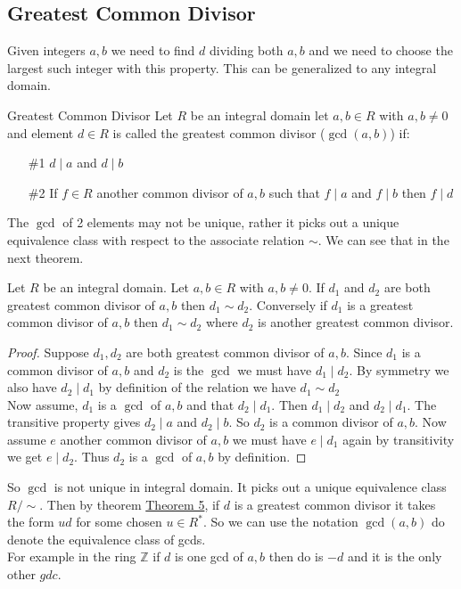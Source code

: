 \documentclass[16pt,a4paper]{article}
\theoremstyle{definition}
\begin{document}
\subsection{Greatest Common Divisor}
Given integers $a,b$ we need to find $d$ dividing both $a,b$ and we need to choose the largest such integer with this property. This can be generalized to any integral domain. 

\begin{defn}{Greatest Common Divisor}{}
Let $R$ be an integral domain let $a,b\in R$ with $a,b\neq 0$ and element $d\in R$ is called the greatest common divisor ($\gcd (a,b)$) if: 
\begin{itemize}
\item[\#1] $d\mid a$ and $d\mid b$
\item[\#2] If $f\in R$ another common divisor of $a,b$ such that $f\mid a$ and $f\mid b$ then $f\mid d$
\end{itemize}
\end{defn}
The $\gcd$ of 2 elements may not be unique, rather it picks out a unique equivalence class with respect to the associate relation $\sim$. We can see that in the next theorem. 

\begin{thm}{}{}
Let $R$ be an integral domain. Let $a,b \in R$ with $a,b\neq 0$. If $d_1$ and $d_2$ are both greatest common divisor of $a,b$ then $d_1\sim d_2$. Conversely if $d_1$ is a greatest common divisor  of $a,b$ then $d_1\sim d_2$ where $d_2$ is another greatest common divisor.  
\end{thm}
\begin{proof}
Suppose $d_1, d_2$ are both greatest common divisor of $a,b$. Since $d_1$ is a common divisor of $a,b$ and $d_2$ is the $\gcd$ we must have $d_1\mid d_2$. By symmetry we also have $d_2\mid d_1$ by definition of the relation we have $d_1\sim d_2$
\\
\newpage
Now assume, $d_1$ is a $\gcd$ of $a,b$ and that $d_2 \mid d_1$. Then $d_1\mid d_2$ and $d_2\mid d_1$. The transitive property gives $d_2\mid a$ and $d_2\mid b$. So $d_2$ is a common divisor of $a,b$. Now assume $e$ another common divisor of $a,b$ we must have $e\mid d_1$ again by transitivity we get $e\mid d_2$. Thus $d_2$ is a $\gcd$ of $a,b$ by definition. 
\end{proof}
So $\gcd$ is not unique in integral domain. It picks out a unique equivalence class $R/\sim$. Then by theorem \hyperref[thm5]{Theorem 5}, if $d$ is a greatest common divisor it takes the form $ud$ for some chosen $u\in R^*$. So we can use the notation $\gcd(a,b)$ do denote the equivalence class of gcds.  
\\
For example in the ring $\mathbb{Z}$ if $d$ is one gcd of $a,b$ then do is $-d$ and it is the only other $gdc$. 
\end{document}
